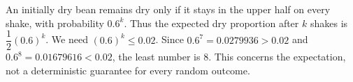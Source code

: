 An initially dry bean remains dry only if it stays in the upper half on every shake, with probability $0.6^k$. Thus the expected dry proportion after $k$ shakes is $\dfrac{1}{2}(0.6)^k$. We need $(0.6)^k\le0.02$. Since $0.6^7=0.0279936>0.02$ and $0.6^8=0.01679616<0.02$, the least number is $\boxed8$. This concerns the expectation, not a deterministic guarantee for every random outcome.
